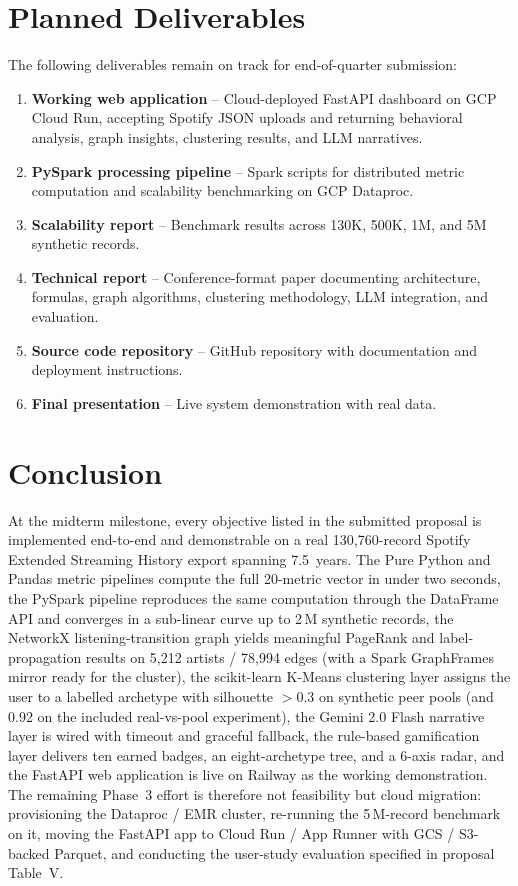 \documentclass[conference]{IEEEtran}
\begin{document}
\section{Planned Deliverables}

The following deliverables remain on track for end-of-quarter submission:

\begin{enumerate}
    \item \textbf{Working web application} -- Cloud-deployed FastAPI dashboard on GCP Cloud Run, accepting Spotify JSON uploads and returning behavioral analysis, graph insights, clustering results, and LLM narratives.
    \item \textbf{PySpark processing pipeline} -- Spark scripts for distributed metric computation and scalability benchmarking on GCP Dataproc.
    \item \textbf{Scalability report} -- Benchmark results across 130K, 500K, 1M, and 5M synthetic records.
    \item \textbf{Technical report} -- Conference-format paper documenting architecture, formulas, graph algorithms, clustering methodology, LLM integration, and evaluation.
    \item \textbf{Source code repository} -- GitHub repository with documentation and deployment instructions.
    \item \textbf{Final presentation} -- Live system demonstration with real data.
\end{enumerate}

\section{Conclusion}

At the midterm milestone, every objective listed in the submitted proposal is implemented end-to-end and demonstrable on a real 130{,}760-record Spotify Extended Streaming History export spanning 7.5~years. The Pure Python and Pandas metric pipelines compute the full 20-metric vector in under two seconds, the PySpark pipeline reproduces the same computation through the DataFrame API and converges in a sub-linear curve up to 2\,M synthetic records, the NetworkX listening-transition graph yields meaningful PageRank and label-propagation results on 5{,}212 artists / 78{,}994 edges (with a Spark GraphFrames mirror ready for the cluster), the scikit-learn K-Means clustering layer assigns the user to a labelled archetype with silhouette $> 0.3$ on synthetic peer pools (and 0.92 on the included real-vs-pool experiment), the Gemini 2.0 Flash narrative layer is wired with timeout and graceful fallback, the rule-based gamification layer delivers ten earned badges, an eight-archetype tree, and a 6-axis radar, and the FastAPI web application is live on Railway as the working demonstration. The remaining Phase~3 effort is therefore not feasibility but cloud migration: provisioning the Dataproc / EMR cluster, re-running the 5\,M-record benchmark on it, moving the FastAPI app to Cloud Run / App Runner with GCS / S3-backed Parquet, and conducting the user-study evaluation specified in proposal Table~V.
\end{document}
